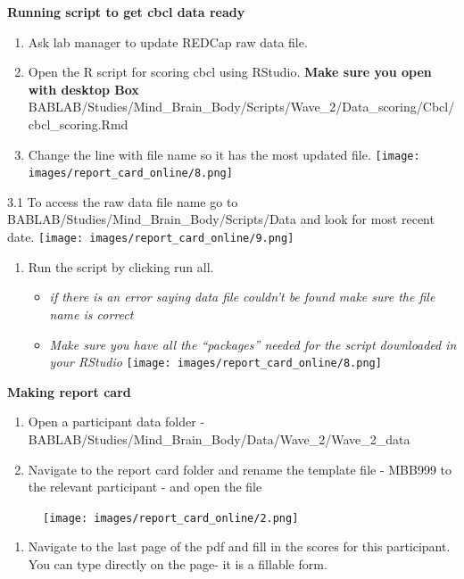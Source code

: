 \documentclass[
]{book}
\providecommand{\tightlist}{%
  \setlength{\itemsep}{0pt}\setlength{\parskip}{0pt}}
\begin{document}
\textbf{Running script to get cbcl data ready}

\begin{enumerate}
\def\labelenumi{\arabic{enumi}.}
\item
  Ask lab manager to update REDCap raw data file.
\item
  Open the R script for scoring cbcl using RStudio. \textbf{Make sure you open with desktop Box} BABLAB/Studies/Mind\_Brain\_Body/Scripts/Wave\_2/Data\_scoring/Cbcl/cbcl\_scoring.Rmd
\item
  Change the line with file name so it has the most updated file.
  \texttt{[image: images/report\_card\_online/8.png]}
\end{enumerate}

3.1 To access the raw data file name go to BABLAB/Studies/Mind\_Brain\_Body/Scripts/Data and look for most recent date.
\texttt{[image: images/report\_card\_online/9.png]}

\begin{enumerate}
\def\labelenumi{\arabic{enumi}.}
\setcounter{enumi}{3}
\tightlist
\item
  Run the script by clicking run all.

  \begin{itemize}
  \tightlist
  \item
    \emph{if there is an error saying data file couldn't be found make sure the file name is correct}
  \item
    \emph{Make sure you have all the ``packages'' needed for the script downloaded in your RStudio}
    \texttt{[image: images/report\_card\_online/8.png]}
  \end{itemize}
\end{enumerate}

\textbf{Making report card}

\begin{enumerate}
\def\labelenumi{\arabic{enumi}.}
\item
  Open a participant data folder - BABLAB/Studies/Mind\_Brain\_Body/Data/Wave\_2/Wave\_2\_data
\item
  Navigate to the report card folder and rename the template file - MBB999 to the relevant participant - and open the file
\end{enumerate}

\begin{figure}
\centering
\texttt{[image: images/report\_card\_online/2.png]}
\caption{}
\end{figure}

\begin{enumerate}
\def\labelenumi{\arabic{enumi}.}
\setcounter{enumi}{2}
\tightlist
\item
  Navigate to the last page of the pdf and fill in the scores for this participant. You can type directly on the page- it is a fillable form.
\end{enumerate}
\end{document}
